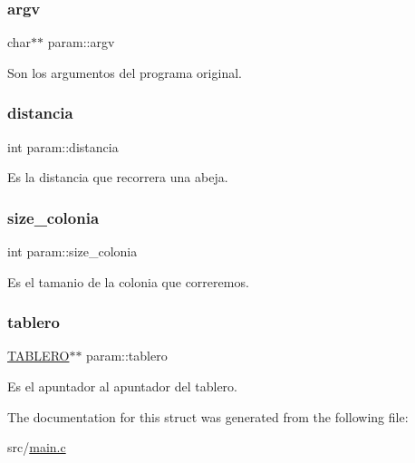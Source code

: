 \subsubsection{\texorpdfstring{argv}{argv}}
{\footnotesize\ttfamily char$\ast$$\ast$ param\+::argv}

Son los argumentos del programa original. \mbox{\label{structparam_a9a96bac8d4ffd9c6873a2d5a194b9240}} 
\subsubsection{\texorpdfstring{distancia}{distancia}}
{\footnotesize\ttfamily int param\+::distancia}

Es la distancia que recorrera una abeja. \mbox{\label{structparam_a461fac084fae7d26b6e687fee5d2966f}} 
\subsubsection{\texorpdfstring{size\+\_\+colonia}{size\_colonia}}
{\footnotesize\ttfamily int param\+::size\+\_\+colonia}

Es el tamanio de la colonia que correremos. \mbox{\label{structparam_ad395dc2901b31a672cfa266253a8694f}} 
\subsubsection{\texorpdfstring{tablero}{tablero}}
{\footnotesize\ttfamily \hyperlink{tablero_8h_acbb1e9c862ccf810af77512ddb019a82}{T\+A\+B\+L\+E\+RO}$\ast$$\ast$ param\+::tablero}

Es el apuntador al apuntador del tablero. 

The documentation for this struct was generated from the following file\+:\begin{DoxyCompactItemize}
\item 
src/\hyperlink{main_8c}{main.\+c}\end{DoxyCompactItemize}
